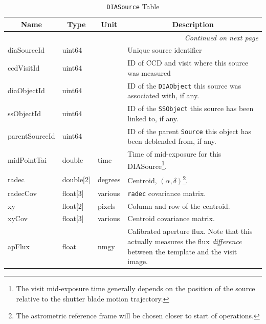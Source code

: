 \documentclass[12pt]{article}
\newcommand{\code}[1]{\texttt{#1}}
\newcommand{\DIASource}{\code{DIASource}\xspace}
\newcommand{\DIAObject}{\code{DIAObject}\xspace}
\newcommand{\Source}{\code{Source}\xspace}
\newcommand{\SSObject}{\code{SSObject}\xspace}
\begin{document}
\begin{center}
\begin{longtable}{p{3cm}p{2cm}p{2cm}p{5cm}}
\caption[\DIASource Table]{\DIASource Table
} \\

\hline \multicolumn{1}{c}{\bf Name} & \multicolumn{1}{c}{\bf Type} & \multicolumn{1}{c}{\bf Unit} & \multicolumn{1}{c}{\bf Description} \\ \hline
\endhead

\hline \multicolumn{4}{r}{{\em Continued on next page}} \\
\endfoot

\hline\hline
\endlastfoot

diaSourceId & uint64 & ~ & Unique source identifier \\

ccdVisitId & uint64 & ~ & ID of CCD and visit where this source was measured \\

diaObjectId & uint64 & ~ & ID of the \DIAObject this source was associated with, if any. \\

ssObjectId & uint64 & ~ & ID of the \SSObject this source has been linked to, if any. \\

parentSourceId & uint64 & ~ & ID of the parent \Source this object has been deblended from, if any. \\

midPointTai & double & time & Time of mid-exposure for this DIASource\footnote{The visit mid-exposure
time generally depends on the position of the source relative to the shutter blade motion trajectory.}. \\

radec & double[2] & degrees & Centroid, $(\alpha, \delta)$\footnote{The astrometric reference frame will be chosen closer to start of operations.}. \\

radecCov & float[3] & various & \texttt{radec} covariance matrix. \\

xy & float[2] & pixels & Column and row of the centroid. \\

xyCov & float[3] & various & Centroid covariance matrix. \\

apFlux & float & nmgy & Calibrated aperture flux. Note that this actually measures
the flux {\em difference} between the template and the visit image. \\


\end{longtable}
\end{center}
\end{document}
